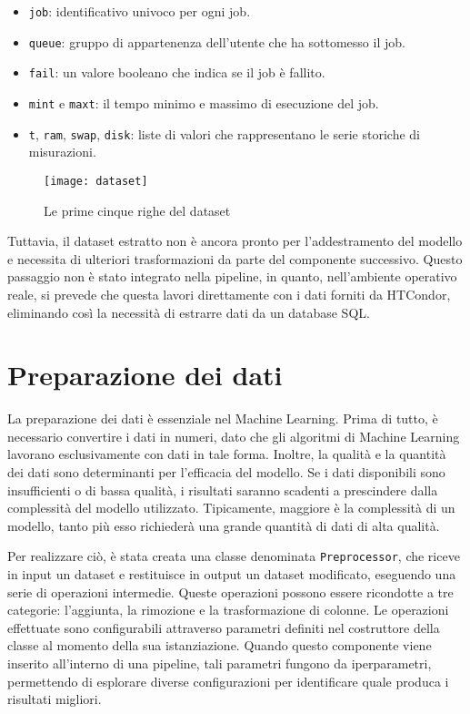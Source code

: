 \begin{itemize}
    \item \texttt{job}: identificativo univoco per ogni job.
    \item \texttt{queue}: gruppo di appartenenza dell'utente che ha sottomesso
        il job.
    \item \texttt{fail}: un valore booleano che indica se il job è fallito.
    \item \texttt{mint} e \texttt{maxt}: il tempo minimo e massimo di
        esecuzione del job.
    \item \texttt{t}, \texttt{ram}, \texttt{swap}, \texttt{disk}: liste di
        valori che rappresentano le serie storiche di misurazioni.
\end{itemize}

\begin{figure}[!ht]
    \centering
    \texttt{[image: dataset]}
    \caption{Le prime cinque righe del dataset}
    \label{fig:dataset_from_join_hj_htjob}
\end{figure}

Tuttavia, il dataset estratto non è ancora pronto per l'addestramento del
modello e necessita di ulteriori trasformazioni da parte del componente
successivo. Questo passaggio non è stato integrato nella pipeline, in quanto,
nell'ambiente operativo reale, si prevede che questa lavori direttamente con i
dati forniti da HTCondor, eliminando così la necessità di estrarre dati da un
database SQL.

\section{Preparazione dei dati}
\label{sec:preprocessing}

La preparazione dei dati è essenziale nel Machine Learning. Prima di tutto, è
necessario convertire i dati in numeri, dato che gli algoritmi di Machine
Learning lavorano esclusivamente con dati in tale forma. Inoltre, la qualità e
la quantità dei dati sono determinanti per l'efficacia del modello. Se i dati
disponibili sono insufficienti o di bassa qualità, i risultati saranno
scadenti a prescindere dalla complessità del modello utilizzato. Tipicamente,
maggiore è la complessità di un modello, tanto più esso richiederà una grande
quantità di dati di alta qualità.

Per realizzare ciò, è stata creata una classe denominata
\texttt{Preprocessor}, che riceve in input un dataset e restituisce in output
un dataset modificato, eseguendo una serie di operazioni intermedie. Queste
operazioni possono essere ricondotte a tre categorie: l'aggiunta, la rimozione
e la trasformazione di colonne. Le operazioni effettuate sono configurabili
attraverso parametri definiti nel costruttore della classe al momento della
sua istanziazione. Quando questo componente viene inserito all'interno di una
pipeline, tali parametri fungono da iperparametri, permettendo di esplorare
diverse configurazioni per identificare quale produca i risultati migliori.

